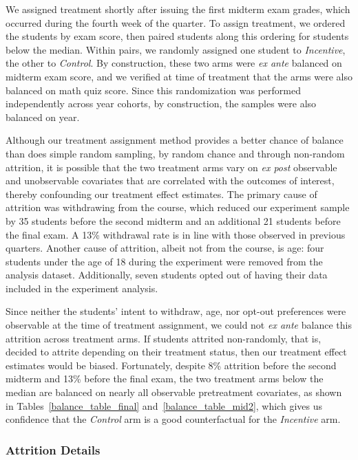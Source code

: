 \documentclass[12pt]{article}
\begin{document}
We assigned treatment shortly after issuing the first midterm exam grades, which occurred during the fourth week of the quarter.
To assign treatment, we ordered the students by exam score, then paired students along this ordering for students below the median.
Within pairs, we randomly assigned one student to \textit{Incentive}, the other to \textit{Control}.
By construction, these two arms were \textit{ex ante} balanced on midterm exam score, and we verified at time of treatment that the arms were also balanced on math quiz score.
Since this randomization was performed independently across year cohorts, by construction, the samples were also balanced on year.

Although our treatment assignment method provides a better chance of balance than does simple random sampling, by random chance and through non-random attrition, it is possible that the two treatment arms vary on \textit{ex post} observable and unobservable covariates that are correlated with the outcomes of interest, thereby confounding our treatment effect estimates.
The primary cause of attrition was withdrawing from the course, which reduced our experiment sample by 35 students before the second midterm and an additional 21 students before the final exam.
A 13\% withdrawal rate is in line with those observed in previous quarters.
Another cause of attrition, albeit not from the course, is age: four students under the age of 18 during the experiment were removed from the analysis dataset.
Additionally, seven students opted out of having their data included in the experiment analysis.

Since neither the students' intent to withdraw, age, nor opt-out preferences were observable at the time of treatment assignment, we could not \textit{ex ante} balance this attrition across treatment arms.
If students attrited non-randomly, that is, decided to attrite depending on their treatment status, then our treatment effect estimates would be biased.
Fortunately, despite 8\% attrition before the second midterm and 13\% before the final exam, the two treatment arms below the median are balanced on nearly all observable pretreatment covariates, as shown in Tables~\ref{balance_table_final} and~\ref{balance_table_mid2}, which gives us confidence that the \textit{Control} arm is a good counterfactual for the \textit{Incentive} arm.

\subsubsection{Attrition Details} \label{subsubsec:a_attrition}
\end{document}
